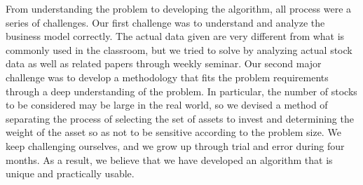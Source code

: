 \documentclass[11pt]{article}
\begin{document}
	From understanding the problem to developing the algorithm, all process were a series of challenges. Our first challenge was to understand and analyze the business model correctly. The actual data given are very different from what is commonly used in the classroom, but we tried to solve by analyzing actual stock data as well as related papers through weekly seminar. Our second major challenge was to develop a methodology that fits the problem requirements through a deep understanding of the problem. In particular, the number of stocks to be considered may be large in the real world, so we devised a method of separating the process of selecting the set of assets to invest and determining the weight of the asset so as not to be sensitive according to the problem size.
	We keep challenging ourselves, and we grow up through trial and error during four months. As a result, we believe that we have developed an algorithm that is unique and practically usable.
	
	
	
\end{document}
